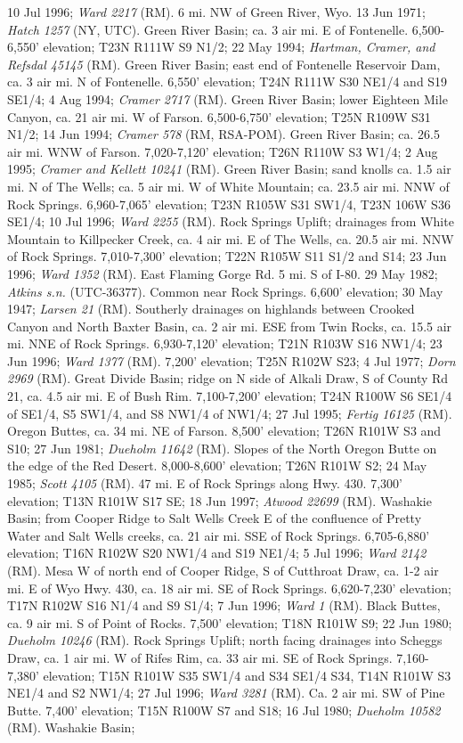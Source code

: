 10 Jul 1996; \textit{Ward 2217} (RM).  6 mi. NW of Green River, Wyo. 13 Jun 1971; \textit{Hatch 1257} (NY, UTC).  Green River Basin; ca. 3 air mi. E of Fontenelle.  6,500-6,550' elevation; T23N R111W S9 N1/2; 22 May 1994; \textit{Hartman, Cramer, and Refsdal 45145} (RM).  Green River Basin; east end of Fontenelle Reservoir Dam, ca. 3 air mi. N of Fontenelle. 6,550' elevation; T24N R111W S30 NE1/4 and S19 SE1/4; 4 Aug 1994; \textit{Cramer 2717} (RM).  Green River Basin; lower Eighteen Mile Canyon, ca. 21 air mi. W of Farson. 6,500-6,750' elevation; T25N R109W S31 N1/2; 14 Jun 1994; \textit{Cramer 578} (RM, RSA-POM).  Green River Basin; ca. 26.5 air mi. WNW of Farson. 7,020-7,120' elevation; T26N R110W S3 W1/4; 2 Aug 1995; \textit{Cramer and Kellett 10241} (RM).  Green River Basin; sand knolls ca. 1.5 air mi. N of The Wells; ca. 5 air mi. W of White Mountain; ca. 23.5 air mi. NNW of Rock Springs. 6,960-7,065' elevation; T23N R105W S31 SW1/4, T23N 106W S36 SE1/4; 10 Jul 1996; \textit{Ward 2255} (RM).  Rock Springs Uplift; drainages from White Mountain to Killpecker Creek, ca. 4 air mi. E of The Wells, ca. 20.5 air mi. NNW of Rock Springs. 7,010-7,300' elevation; T22N R105W S11 S1/2 and S14; 23 Jun 1996; \textit{Ward 1352} (RM).  East Flaming Gorge Rd. 5 mi. S of I-80. 29 May 1982; \textit{Atkins s.n.} (UTC-36377).  Common near Rock Springs. 6,600' elevation; 30 May 1947; \textit{Larsen 21} (RM).  Southerly drainages on highlands between Crooked Canyon and North Baxter Basin, ca. 2 air mi. ESE from Twin Rocks, ca. 15.5 air mi. NNE of Rock Springs. 6,930-7,120' elevation; T21N R103W S16 NW1/4; 23 Jun 1996; \textit{Ward 1377} (RM).  7,200' elevation; T25N R102W S23; 4 Jul 1977; \textit{Dorn 2969} (RM).  Great Divide Basin; ridge on N side of Alkali Draw, S of County Rd 21, ca. 4.5 air mi. E of Bush Rim. 7,100-7,200' elevation; T24N R100W S6 SE1/4 of SE1/4, S5 SW1/4, and S8 NW1/4 of NW1/4; 27 Jul 1995; \textit{Fertig 16125} (RM).  Oregon Buttes, ca. 34 mi. NE of Farson. 8,500' elevation; T26N R101W S3 and S10; 27 Jun 1981; \textit{Dueholm 11642} (RM).  Slopes of the North Oregon Butte on the edge of the Red Desert. 8,000-8,600' elevation; T26N R101W S2; 24 May 1985; \textit{Scott 4105} (RM).  47 mi. E of Rock Springs along Hwy. 430.	7,300' elevation; T13N R101W S17 SE; 18 Jun 1997; \textit{Atwood 22699} (RM).  Washakie Basin; from Cooper Ridge to Salt Wells Creek E of the confluence of Pretty Water and Salt Wells creeks, ca. 21 air mi. SSE of Rock Springs. 6,705-6,880' elevation; T16N R102W S20 NW1/4 and S19 NE1/4; 5 Jul 1996; \textit{Ward 2142} (RM).  Mesa W of north end of Cooper Ridge, S of Cutthroat Draw, ca. 1-2 air mi. E of Wyo Hwy. 430, ca. 18 air mi. SE of Rock Springs. 6,620-7,230' elevation; T17N R102W S16 N1/4 and S9 S1/4; 7 Jun 1996; \textit{Ward 1} (RM).  Black Buttes, ca. 9 air mi. S of Point of Rocks. 7,500' elevation; T18N R101W S9; 22 Jun 1980; \textit{Dueholm 10246} (RM).  Rock Springs Uplift; north facing drainages into Scheggs Draw, ca. 1 air mi. W of Rifes Rim, ca. 33 air mi. SE of Rock Springs. 7,160-7,380' elevation; T15N R101W S35 SW1/4 and S34 SE1/4 S34, T14N R101W S3 NE1/4 and S2 NW1/4; 27 Jul 1996; \textit{Ward 3281} (RM).  Ca. 2 air mi. SW of Pine Butte. 7,400' elevation; T15N R100W S7 and S18; 16 Jul 1980; \textit{Dueholm 10582} (RM).  Washakie Basin; 